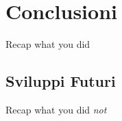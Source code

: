 \section{Conclusioni}

Recap what you did

\subsection{Sviluppi Futuri}

Recap what you did \emph{not}

